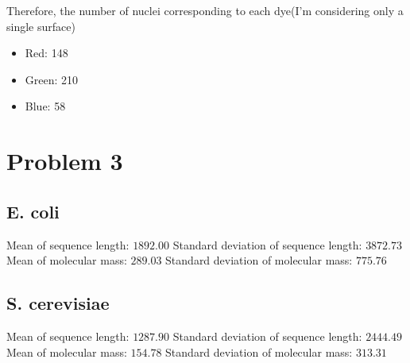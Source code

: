 \documentclass[a4paper]{article}
\begin{document}
    Therefore, the number of nuclei corresponding to each dye(I'm considering only a single surface)
    \begin{itemize}
        \item Red: 148
        \item Green: 210
        \item Blue: 58
    \end{itemize}
\pagebreak
\section{Problem 3}
\subsection{E. coli}
Mean of sequence length: $1892.00$ \newline
Standard deviation of sequence length: $3872.73$ \newline
Mean of molecular mass: $289.03$ \newline
Standard deviation of molecular mass: $775.76$ \newline
\subsection{S. cerevisiae}
Mean of sequence length: $1287.90$ \newline
Standard deviation of sequence length: $2444.49$ \newline
Mean of molecular mass: $154.78$ \newline
Standard deviation of molecular mass: $313.31$ \newline
\end{document}
